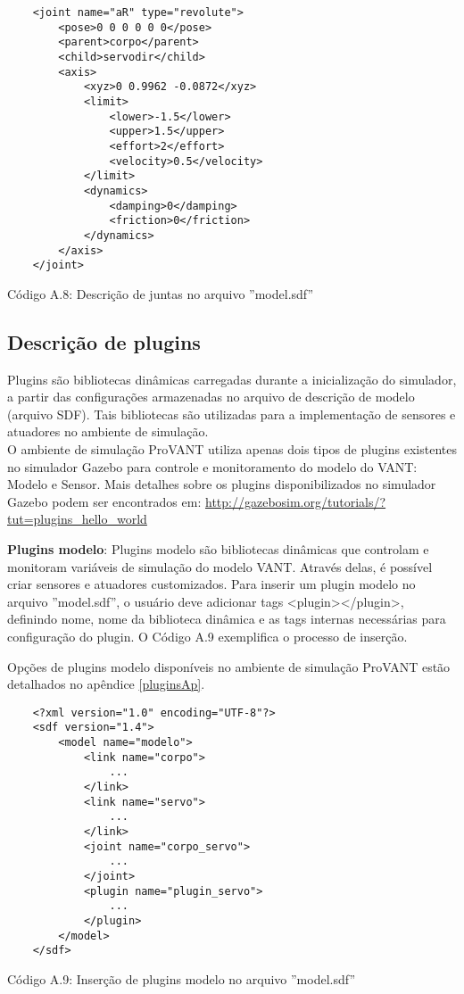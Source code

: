 	\begin{verbatim}
	<joint name="aR" type="revolute">
		<pose>0 0 0 0 0 0</pose>
		<parent>corpo</parent>
		<child>servodir</child>
		<axis>
			<xyz>0 0.9962 -0.0872</xyz>
			<limit>
				<lower>-1.5</lower>
				<upper>1.5</upper>
				<effort>2</effort>
				<velocity>0.5</velocity>
			</limit>
			<dynamics>
				<damping>0</damping>
				<friction>0</friction>
			</dynamics>
		</axis>
	</joint>
	\end{verbatim}
	\centerline{Código A.8: Descrição de juntas no arquivo ''model.sdf''}
	
\subsection{Descrição de plugins}
\label{plugins}

Plugins são bibliotecas dinâmicas carregadas durante a inicialização do simulador, a partir das configurações armazenadas no arquivo de descrição de modelo (arquivo SDF). Tais bibliotecas são utilizadas para a implementação de sensores e atuadores no ambiente de simulação. \\

O ambiente de simulação ProVANT utiliza apenas dois tipos de plugins existentes no simulador Gazebo para controle e monitoramento do modelo do VANT: Modelo e Sensor. Mais detalhes sobre os plugins disponibilizados no simulador Gazebo podem ser encontrados em: \url{http://gazebosim.org/tutorials/?tut=plugins\_hello\_world}

\noindent \textbf{Plugins modelo}: Plugins modelo são bibliotecas dinâmicas que controlam e monitoram variáveis de simulação do modelo VANT. Através delas, é possível criar sensores e atuadores customizados. Para inserir um plugin modelo no arquivo ''model.sdf'', o usuário deve adicionar tags <plugin></plugin>, definindo nome, nome da biblioteca dinâmica e as tags internas necessárias para configuração do plugin. O Código A.9 exemplifica o processo de inserção. 

Opções de plugins modelo disponíveis no ambiente de simulação ProVANT estão detalhados no apêndice \ref{pluginsAp}.


	\begin{verbatim}
	<?xml version="1.0" encoding="UTF-8"?>
	<sdf version="1.4">
		<model name="modelo">
			<link name="corpo">
				...
			</link>
			<link name="servo">
				...
			</link>
			<joint name="corpo_servo">
				...
			</joint>
			<plugin name="plugin_servo">
				...
			</plugin>
		</model>
	</sdf>
	\end{verbatim}
	\centerline{Código A.9: Inserção de plugins modelo no arquivo ''model.sdf''}
	
